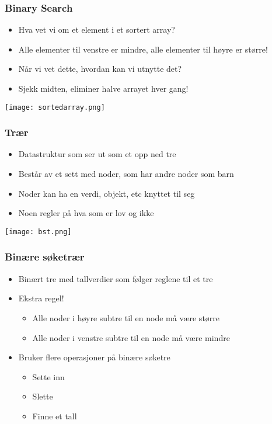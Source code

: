 \documentclass[norsk, handout]{beamer}
\begin{document}
    \begin{frame}
        \frametitle{Binary Search}

        \begin{itemize}
            \item Hva vet vi om et element i et sortert array?
            \pause
            \item Alle elementer til venstre er mindre, alle elementer til høyre er
                større!
            \pause
            \item Når vi vet dette, hvordan kan vi utnytte det?
            \pause
            \item Sjekk midten, eliminer halve arrayet hver gang!
        \end{itemize}
    \end{frame}

    \begin{frame}
        \texttt{[image: sortedarray.png]}
    \end{frame}


    \begin{frame}
        \frametitle{Trær}
        \begin{itemize}
            \item Datastruktur som ser ut som et opp ned tre
            \item Består av et sett med noder, som har andre noder som barn
            \item Noder kan ha en verdi, objekt, etc knyttet til seg
            \item Noen regler på hva som er lov og ikke
        \end{itemize}

        \texttt{[image: bst.png]}

    \end{frame}

    \begin{frame}
        \frametitle{Binære søketrær}
        \begin{itemize}
            \item Binært tre med tallverdier som følger reglene til et tre
            \item Ekstra regel!
            \begin{itemize}
                \item Alle noder i høyre subtre til en node må være større
                \item Alle noder i venstre subtre til en node må være mindre
            \end{itemize}
            \item Bruker flere operasjoner på binære søketre
                \begin{itemize}
                    \item Sette inn
                    \item Slette
                    \item Finne et tall
                \end{itemize}
        \end{itemize}

    \end{frame}
\end{document}
